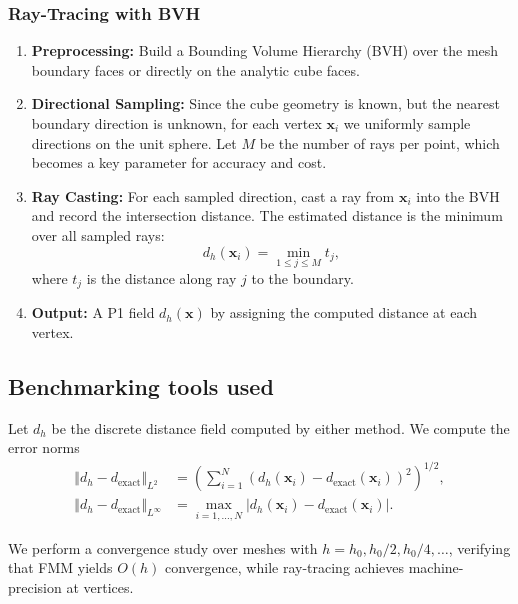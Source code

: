 \subsubsection{Ray-Tracing with BVH}
\begin{enumerate}
  \item \textbf{Preprocessing:} Build a Bounding Volume Hierarchy (BVH) over the mesh boundary faces or directly on the analytic cube faces.
  \item \textbf{Directional Sampling:} Since the cube geometry is known, but the nearest boundary direction is unknown, for each vertex $\mathbf{x}_i$ we uniformly sample directions on the unit sphere. Let $M$ be the number of rays per point, which becomes a key parameter for accuracy and cost.
  \item \textbf{Ray Casting:} For each sampled direction, cast a ray from $\mathbf{x}_i$ into the BVH and record the intersection distance. The estimated distance is the minimum over all sampled rays:
  \[ d_h(\mathbf{x}_i) = \min_{1\le j\le M} t_j, \]
  where $t_j$ is the distance along ray $j$ to the boundary.
  \item \textbf{Output:} A P1 field $d_h(\mathbf{x})$ by assigning the computed distance at each vertex.
\end{enumerate}





\subsection{Benchmarking tools used}

Let $d_h$ be the discrete distance field computed by either method. We compute the error norms
\begin{subequations}
\begin{align}
  \Vert d_h - d_{\mathrm{exact}}\Vert_{L^2} &= \left( \sum_{i=1}^N (d_h(\mathbf{x}_i) - d_{\mathrm{exact}}(\mathbf{x}_i))^2
    \right)^{1/2},\\
  \Vert d_h - d_{\mathrm{exact}}\Vert_{L^\infty} &= \max_{i=1,\dots,N} |d_h(\mathbf{x}_i) - d_{\mathrm{exact}}(\mathbf{x}_i)|.
\end{align}
\label{eq:specs:feelpp:distance:error}
\end{subequations}

We perform a convergence study over meshes with $h = h_0, h_0/2, h_0/4, \dots$, verifying that FMM yields $O(h)$ convergence, while ray-tracing achieves machine-precision at vertices.



